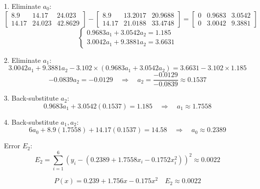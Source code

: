 \begin{enumerate}
    1. Eliminate \(a_0\):
    \[
      \begin{bmatrix}
        8.9 & 14.17 & 24.023 \\
        14.17 & 24.023 & 42.8629
      \end{bmatrix}
      -
      \begin{bmatrix}
        8.9 & 13.2017 & 20.9688 \\
        14.17 & 21.0188 & 33.4748
      \end{bmatrix}
      =
      \begin{bmatrix}
        0 & 0.9683 & 3.0542 \\
        0 & 3.0042 & 9.3881
      \end{bmatrix}
    \]
    \[
      \begin{cases}
        0.9683a_1 + 3.0542a_2 = 1.185 \\
        3.0042a_1 + 9.3881a_2 = 3.6631
      \end{cases}
    \]

    2. Eliminate \(a_1\):
    \[
      3.0042a_1 + 9.3881a_2 - 3.102 \times (0.9683a_1 + 3.0542a_2) =
      3.6631 - 3.102 \times 1.185
    \]
    \[
      -0.0839a_2 = -0.0129 \quad \Rightarrow \quad a_2 =
      \frac{-0.0129}{-0.0839} \approx 0.1537
    \]

    3. Back-substitute \(a_2\):
    \[
      0.9683a_1 + 3.0542(0.1537) = 1.185 \quad \Rightarrow \quad a_1
      \approx 1.7558
    \]

    4. Back-substitute \(a_1, a_2\):
    \[
      6a_0 + 8.9(1.7558) + 14.17(0.1537) = 14.58 \quad \Rightarrow
      \quad a_0 \approx 0.2389
    \]

    Error \(E_2\):
    \[
      E_2 = \sum_{i=1}^6 \left(y_i - (0.2389 + 1.7558x_i -
      0.1752x_i^2)\right)^2 \approx 0.0022
    \]

    \[
      \boxed{P(x) = 0.239 + 1.756x - 0.175x^2} \quad \boxed{E_2 \approx 0.0022}
    \]

\end{enumerate}
